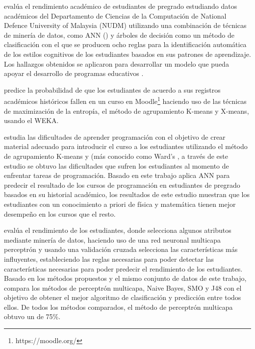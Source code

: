 \textcite{chen2008integrated} evalúa el rendimiento académico de estudiantes de pregrado estudiando datos académicos del Departamento de Ciencias de la Computación de National Defence University of Malaysia (NUDM) utilizando una combinación de técnicas de minería de datos, como ANN () y árboles de decisión como un método de clasificación con el que se producen ocho reglas para la identificación automática de los estilos cognitivos de los estudiantes basados en sus patrones de aprendizaje. Los hallazgos obtenidos se aplicaron para desarrollar un modelo que pueda apoyar el desarrollo de programas educativos .

\textcite{moreno2009data} predice la probabilidad de que los estudiantes de acuerdo a sus registros académicos históricos fallen en un curso  en Moodle\footnote{https://moodle.org/} haciendo uso de las técnicas de maximización de la entropía, el método de agrupamiento K-means y X-means, usando el  WEKA.


\textcite{lahtinen2005study} estudia las dificultades de aprender programación con el objetivo de crear material adecuado para introducir el curso a los estudiantes utilizando el método de agrupamiento K-means y  (más conocido como Ward's , a través de este estudio se obtuvo las dificultades que sufren los estudiantes al momento de enfrentar tareas de programación. Basado en este trabajo \textcite{akinola2012data} aplica ANN para predecir el resultado de los cursos de programación en estudiantes de pregrado basados en su historial académico, los resultados de este estudio muestran que los estudiantes con un conocimiento a priori de física y matemática tienen mejor desempeño en los cursos que el resto.

\textcite{borkar2014attributes} evalúa el rendimiento de los estudiantes, donde selecciona algunos atributos mediante minería de datos, haciendo uso de una red neuronal multicapa perceptrón y usando una validación cruzada selecciona las características más influyentes, estableciendo las reglas necesarias para poder detectar las características necesarias para poder predecir el rendimiento de los estudiantes. Basado en los métodos propuestos y el mismo conjunto de datos de este trabajo, \textcite{jayakameswaraiah2014study} compara los métodos de perceptrón multicapa, Naive Bayes, SMO y J48 con el objetivo de obtener el mejor algoritmo de clasificación y predicción entre todos ellos. De todos los métodos comparados, el método de perceptrón multicapa obtuvo un  de 75\%.


